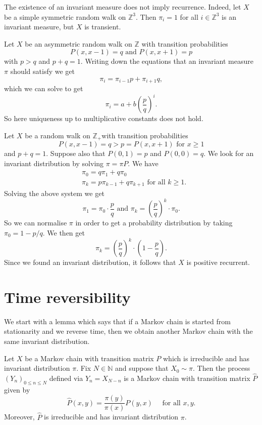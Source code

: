 \documentclass[a4paper]{article}
\begin{document}
\begin{remark}
    The existence of an invariant measure does not imply recurrence. Indeed, let $X$ be a simple symmetric random walk on $\mathbb{Z}^3$. Then $\pi_i=1$ for all $i \in \mathbb{Z}^3$ is an invariant measure, but $X$ is transient.
\end{remark}

\begin{example}
    Let $X$ be an asymmetric random walk on $\mathbb{Z}$ with transition probabilities
    \[
    P(x, x-1)=q \text { and } P(x, x+1)=p
    \]
    with $p>q$ and $p+q=1$. Writing down the equations that an invariant measure $\pi$ should satisfy we get
    \[
    \pi_i=\pi_{i-1} p+\pi_{i+1} q,
    \]
    which we can solve to get
    \[
    \pi_i=a+b\left(\frac{p}{q}\right)^i .
    \]
    So here uniqueness up to multiplicative constants does not hold.
\end{example}

\begin{example}
    Let $X$ be a random walk on $\mathbb{Z}_{+}$with transition probabilities
    \[
    P(x, x-1)=q>p=P(x, x+1) \text { for } x \geq 1
    \]
    and $p+q=1$. Suppose also that $P(0,1)=p$ and $P(0,0)=q$. We look for an invariant distribution by solving $\pi=\pi P$. We have
    \[
    \begin{aligned}
    &\pi_0=q \pi_1+q \pi_0 \\
    &\pi_k=p \pi_{k-1}+q \pi_{k+1} \text { for all } k \geq 1 .
    \end{aligned}
    \]
    Solving the above system we get
    \[
    \pi_1=\pi_0 \cdot \frac{p}{q} \text { and } \pi_k=\left(\frac{p}{q}\right)^k \cdot \pi_0 .
    \]
    So we can normalise $\pi$ in order to get a probability distribution by taking $\pi_0=1-p / q$. We then get
    \[
    \pi_k=\left(\frac{p}{q}\right)^k \cdot\left(1-\frac{p}{q}\right) .
    \]
    Since we found an invariant distribution, it follows that $X$ is positive recurrent.
\end{example}

\section{Time reversibility}

We start with a lemma which says that if a Markov chain is started from stationarity and we reverse time, then we obtain another Markov chain with the same invariant distribution.

\begin{proposition}
    Let $X$ be a Markov chain with transition matrix $P$ which is irreducible and has invariant distribution $\pi$. Fix $N \in \mathbb{N}$ and suppose that $X_0 \sim \pi$. Then the process $\left(Y_n\right)_{0 \leq n \leq N}$ defined via $Y_n=X_{N-n}$ is a Markov chain with transition matrix $\widehat{P}$ given by
    \[
    \widehat{P}(x, y)=\frac{\pi(y)}{\pi(x)} P(y, x) \quad \text { for all } x, y .
    \]
    Moreover, $\widehat{P}$ is irreducible and has invariant distribution $\pi$.
\end{proposition}
\end{document}
